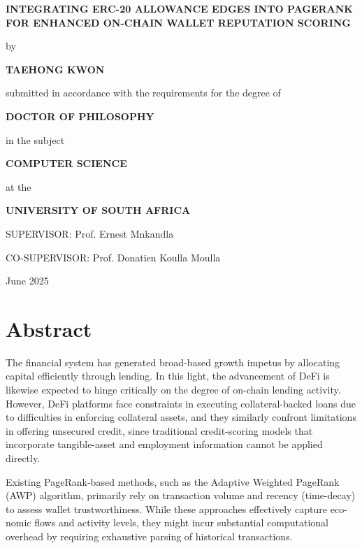 \documentclass[12pt]{article}
\begin{document}
\begin{titlepage}
\centering
\vspace*{0.4cm}
{\Large\bfseries INTEGRATING ERC-20 ALLOWANCE EDGES INTO PAGERANK FOR ENHANCED ON-CHAIN WALLET REPUTATION SCORING\par}
\vfill
{by\par}
\vspace{0.7cm}
{\large\bfseries TAEHONG KWON\par}
\vfill
{submitted in accordance with the requirements for the degree of\par}
\vspace{0.7cm}
{\large\bfseries DOCTOR OF PHILOSOPHY\par}
\vspace{0.35cm}
{in the subject\par}
\vspace{0.7cm}
{\large\bfseries COMPUTER SCIENCE\par}
\vfill
{at the\par}
\vspace{0.7cm}
{\large\bfseries UNIVERSITY OF SOUTH AFRICA\par}
\vfill
{SUPERVISOR: Prof. Ernest Mnkandla\par}
\vspace{0.35cm}
{CO-SUPERVISOR: Prof. Donatien Koulla Moulla\par}
\vfill
{June 2025\par}
\end{titlepage}
\restoregeometry

\section*{Abstract}
\label{sec:abstract}

The financial system has generated broad-based growth impetus by allocating capital efficiently through lending. In this light, the advancement of DeFi is likewise expected to hinge critically on the degree of on-chain lending activity. However, DeFi platforms face constraints in executing collateral-backed loans due to difficulties in enforcing collateral assets, and they similarly confront limitations in offering unsecured credit, since traditional credit-scoring models that incorporate tangible-asset and employment information cannot be applied directly.


Existing PageRank-based methods, such as the Adaptive Weighted PageRank (AWP) algorithm, primarily rely on transaction volume and recency (time-decay) to assess wallet trustworthiness. While these approaches effectively capture eco- nomic flows and activity levels, they might incur substantial computational overhead by requiring exhaustive parsing of historical transactions.
\end{document}
